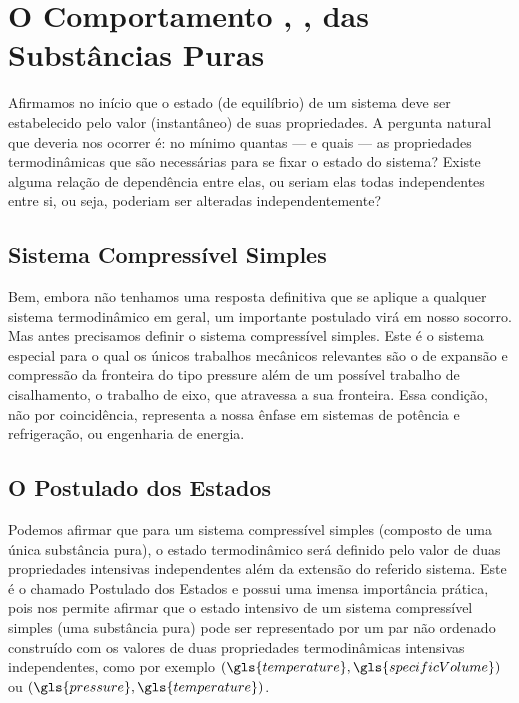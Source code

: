 \chapter{%
    O Comportamento , ,
     das Substâncias Puras
}
\label{chap:pureSubstances}

    Afirmamos no início que o estado (de equilíbrio) de um sistema deve ser
    estabelecido pelo valor (instantâneo) de suas propriedades. A pergunta
    natural que deveria nos ocorrer é: no mínimo quantas --- e quais --- as
    propriedades termodinâmicas que são necessárias para se fixar o estado do
    sistema?  Existe alguma relação de dependência entre elas, ou seriam elas
    todas independentes entre si, ou seja, poderiam ser alteradas
    independentemente?


    \section{Sistema Compressível Simples}

    Bem, embora não tenhamos uma resposta definitiva que se aplique a qualquer
    sistema termodinâmico em geral, um importante postulado virá em nosso
    socorro. Mas antes precisamos definir o sistema compressível simples. Este
    é o sistema especial para o qual os únicos trabalhos mecânicos relevantes
    são o de expansão e compressão da fronteira do tipo
    \gls{pressure} além de um possível trabalho de
    cisalhamento, o trabalho de eixo, que atravessa a sua fronteira. Essa
    condição, não por coincidência, representa a nossa ênfase em sistemas de
    potência e refrigeração, ou engenharia de energia.


    \section{O Postulado dos Estados}

    Podemos afirmar que para um sistema compressível simples (composto de uma
    única substância pura), o estado termodinâmico será definido pelo valor de
    duas propriedades intensivas independentes além da extensão do referido
    sistema. Este é o chamado Postulado dos Estados e possui uma imensa
    importância prática, pois nos permite afirmar que o estado intensivo de um
    sistema compressível simples (uma substância pura) pode ser representado
    por um par não ordenado construído com os valores de duas propriedades
    termodinâmicas intensivas independentes, como por exemplo
    $(\gls{temperature},\gls{specificVolume})$ ou
    $(\gls{pressure},\gls{temperature})$.

